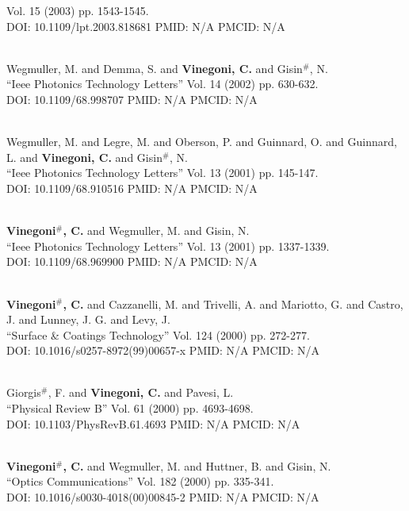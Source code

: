 Vol. 15 (2003) pp. 1543-1545. \\ DOI: 10.1109/lpt.2003.818681 PMID: N/A PMCID: N/A\item {} \\ Wegmuller, M. and Demma, S. and {\bf Vinegoni, C.} and Gisin$^\#$, N. \\ ``Ieee Photonics Technology Letters'' Vol. 14 (2002) pp. 630-632. \\ DOI: 10.1109/68.998707 PMID: N/A PMCID: N/A\item {} \\ Wegmuller, M. and Legre, M. and Oberson, P. and Guinnard, O. and Guinnard, L. and {\bf Vinegoni, C.} and Gisin$^\#$, N. \\ ``Ieee Photonics Technology Letters'' Vol. 13 (2001) pp. 145-147. \\ DOI: 10.1109/68.910516 PMID: N/A PMCID: N/A\item {} \\ {\bf Vinegoni$^\#$, C.} and Wegmuller, M. and Gisin, N. \\ ``Ieee Photonics Technology Letters'' Vol. 13 (2001) pp. 1337-1339. \\ DOI: 10.1109/68.969900 PMID: N/A PMCID: N/A\item {} \\ {\bf Vinegoni$^\#$, C.} and Cazzanelli, M. and Trivelli, A. and Mariotto, G. and Castro, J. and Lunney, J. G. and Levy, J. \\ ``Surface & Coatings Technology'' Vol. 124 (2000) pp. 272-277. \\ DOI: 10.1016/s0257-8972(99)00657-x PMID: N/A PMCID: N/A\item {} \\ Giorgis$^\#$, F. and {\bf Vinegoni, C.} and Pavesi, L. \\ ``Physical Review B'' Vol. 61 (2000) pp. 4693-4698. \\ DOI: 10.1103/PhysRevB.61.4693 PMID: N/A PMCID: N/A\item {} \\ {\bf Vinegoni$^\#$, C.} and Wegmuller, M. and Huttner, B. and Gisin, N. \\ ``Optics Communications'' Vol. 182 (2000) pp. 335-341. \\ DOI: 10.1016/s0030-4018(00)00845-2 PMID: N/A PMCID: N/A\item 